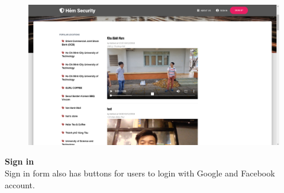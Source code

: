 \begin{figure}[!htb]
\endminipage\hfill
{}
  \includegraphics[width=\linewidth]{images/chap4/homepage.png}
\endminipage
\end{figure}
\cleardoublepage
\textbf{Sign in}
\\
Sign in form also has buttons for users to login with Google and Facebook account.

